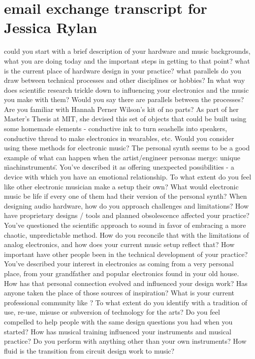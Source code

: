 \section{email exchange transcript for Jessica Rylan}

could you start with a brief description of your hardware and music backgrounds, what you are doing today and the important steps in getting to that point? 
what is the current place of hardware design in your practice? 
what parallels do you draw between technical processes and other disciplines or hobbies? 
In what way does scientific research trickle down to influencing your electronics and the music you make with them? Would you say there are parallels between the processes? 
Are you familiar with Hannah Perner Wilson’s kit of no parts? As part of her Master’s Thesis at MIT, she devised this set of objects that could be built using some homemade elements - conductive ink to turn seashells into speakers, conductive thread to make electronics in wearables, etc. Would you consider using these methods for electronic music? 
The personal synth seems to be a good example of what can happen when the artist/engineer personas merge: unique \"machinstruments\". You've described it as offering unexpected possibilities - a device with which you have an emotional relationship. To what extent do you feel like other electronic musician make a setup their own? 
What would electronic music be life if every one of them had their version of the personal synth? 
When designing audio hardware, how do you approach challenges and limitations?
How have proprietary designs / tools and planned obsolescence affected your practice?
You've questioned the scientific approach to sound in favor of embracing a more chaotic, unpredictable method. How do you reconcile that with the limitations of analog electronics, and how does your current music setup reflect that? 
How important have other people been in the technical development of your practice? 
You've described your interest in electronics as coming from a very personal place, from your grandfather and popular electronics found in your old house. How has that personal connection evolved and influenced your design work? Has anyone taken the place of those sources of inspiration? 
What is your current professional community like ? 
To what extent do you identify with a tradition of use, re-use, misuse or subversion of technology for the arts? 
Do you feel compelled to help people with the same design questions you had when you started? 
How has musical training influenced your instruments and musical practice? 
Do you perform with anything other than your own instruments? 
How fluid is the transition from circuit design work to music?  

